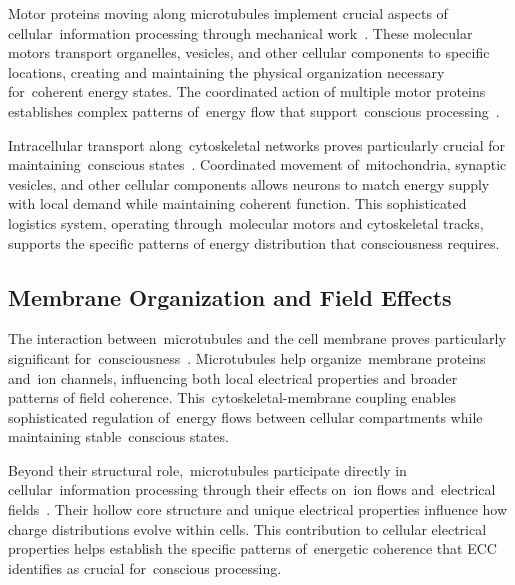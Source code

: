Motor proteins moving along microtubules implement crucial aspects of cellular~information processing through mechanical work~\cite{Kueh2009, Fletcher2010}. These molecular motors transport organelles, vesicles, and other cellular components to specific locations, creating and maintaining the physical organization necessary for~coherent energy states. The coordinated action of multiple motor proteins establishes complex patterns of~energy flow that support~conscious processing~\cite{Kapitein2015, Attwell2001}.

Intracellular transport along~cytoskeletal networks proves particularly crucial for maintaining~conscious states~\cite{Kapitein2015, Attwell2001}. Coordinated movement of~mitochondria, synaptic vesicles, and other cellular components allows neurons to match energy supply with local demand while maintaining coherent function. This sophisticated logistics system, operating through~molecular motors and cytoskeletal tracks, supports the specific patterns of energy distribution that consciousness requires.

\subsection*{Membrane Organization and Field Effects~~}

The interaction between~microtubules and the cell membrane proves particularly significant for~consciousness~\cite{pinotsis2023cytoelectric, Bezanilla2002}. Microtubules help organize~membrane proteins and~ion channels, influencing both local electrical properties and broader patterns of field coherence. This~cytoskeletal-membrane coupling enables sophisticated regulation of~energy flows between cellular compartments while maintaining stable~conscious states.

Beyond their structural role,~microtubules participate directly in cellular~information processing through their effects on~ion flows and~electrical fields~\cite{Dent2014, hunt2024electromagnetic}. Their hollow core structure and unique electrical properties influence how charge distributions evolve within cells. This contribution to cellular electrical properties helps establish the specific patterns of~energetic coherence that ECC identifies as crucial for~conscious processing.


